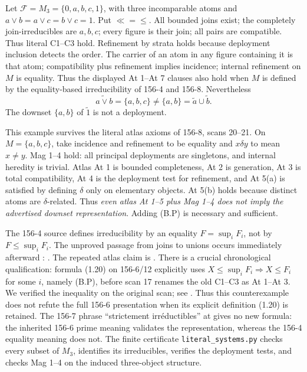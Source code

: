 \begin{counterexample}
\label{SA21-B-M3}
Let \(\mathscr F=M_3=\{0,a,b,c,1\}\), with three incomparable atoms and
\(a\vee b=a\vee c=b\vee c=1\). Put \(\ll=\leq\).
All bounded joins exist; the completely join-irreducibles are
\(a,b,c\); every figure is their join; all pairs are compatible.
Thus literal C1--C3 hold. Refinement by strata holds because deployment
inclusion detects the order. The carrier of an atom in any figure
containing it is that atom; compatibility plus refinement implies
incidence; internal refinement on \(M\) is equality. Thus the displayed
At 1--At 7 clauses also hold when \(M\) is defined by the
equality-based irreducibility of 156-4 and 156-8. Nevertheless
\[
 \widetilde{a\vee b}=\{a,b,c\}\ne\{a,b\}
   =\widetilde a\cup\widetilde b.
\]
The downset \(\{a,b\}\) of \(\widetilde1\) is not a deployment.

This example survives the literal atlas axioms of 156-8, scans 20--21.
On \(M=\{a,b,c\}\), take incidence and refinement to be equality and
\(x\delta y\) to mean \(x\ne y\). Mag 1--4 hold: all principal
deployments are singletons, and internal heredity is trivial. Atlas
At 1 is bounded completeness, At 2 is generation, At 3 is total
compatibility, At 4 is the deployment test for refinement, and At 5(a)
is satisfied by defining \(\delta\) only on elementary objects.
At 5(b) holds because distinct atoms are \(\delta\)-related. Thus
\emph{even atlas At 1--5 plus Mag 1--4 does not imply the advertised
downset representation}. Adding (B.P) is necessary and sufficient.
\end{counterexample}

The 156-4 source defines irreducibility by an equality
\(F=\sup_iF_i\), not by \(F\leq\sup_iF_i\).
The unproved passage from joins to unions occurs immediately afterward
\citep[156-4, scans 54--57]{Grothendieck1986}:
.
The repeated atlas claim is
.
There is a crucial chronological qualification: formula (1.20) on
156-6/12 explicitly uses \(X\leq\sup_iF_i\Rightarrow
X\leq F_i\) for some \(i\), namely (B.P), before scan 17 renames
the old C1--C3 as At 1--At 3. We verified the inequality on the
original scan; see
.
Thus this counterexample does not refute the full 156-6 presentation
when its explicit definition (1.20) is retained.
The 156-7 phrase ``strictement irr\'eductibles'' at
 gives no new formula:
the inherited 156-6 prime meaning validates the representation,
whereas the 156-4 equality meaning does not.
The finite certificate \texttt{literal\_systems.py} checks every subset
of \(M_3\), identifies its irreducibles, verifies the deployment tests,
and checks Mag 1--4 on the induced three-object structure.

